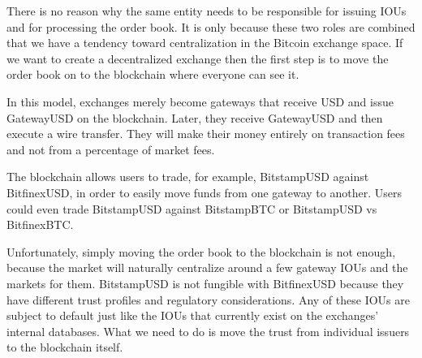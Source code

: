 There is no reason why the same entity needs to be responsible for issuing IOUs
and for processing the order book. It is only because these two roles are
combined that we have a tendency toward centralization in the Bitcoin exchange
space. If we want to create a decentralized exchange then the first step is to
move the order book on to the blockchain where everyone can see it.

In this model, exchanges merely become gateways that receive USD and issue
GatewayUSD on the blockchain. Later, they receive GatewayUSD and then execute
a wire transfer. They will make their money entirely on transaction fees and
not from a percentage of market fees.

The blockchain allows users to trade, for example, BitstampUSD against
BitfinexUSD, in order to easily move funds from one gateway to another. Users
could even trade BitstampUSD against BitstampBTC or BitstampUSD vs BitfinexBTC.

Unfortunately, simply moving the order book to the blockchain is not enough,
because the market will naturally centralize around a few gateway IOUs and the
markets for them. BitstampUSD is not fungible with BitfinexUSD because they
have different trust profiles and regulatory considerations. Any of these
IOUs are subject to default just like the IOUs that currently exist on the
exchanges' internal databases. What we need to do is move the trust from
individual issuers to the blockchain itself.
